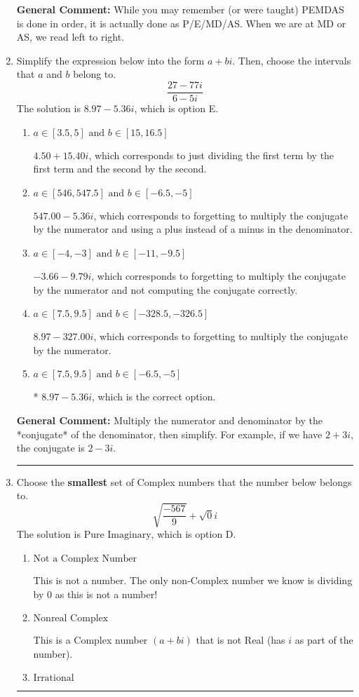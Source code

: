 \documentclass{extbook}[14pt]
\newcommand{\litem}[1]{\item #1

\rule{\textwidth}{0.4pt}}
\begin{document}
\begin{enumerate}
{\textbf{General Comment:} While you may remember (or were taught) PEMDAS is done in order, it is actually done as P/E/MD/AS. When we are at MD or AS, we read left to right.
}
\litem{
Simplify the expression below into the form $a+bi$. Then, choose the intervals that $a$ and $b$ belong to.
\[ \frac{27 - 77 i}{6 - 5 i} \]The solution is \( 8.97  - 5.36 i \), which is option E.\begin{enumerate}[label=\Alph*.]
\item \( a \in [3.5, 5] \text{ and } b \in [15, 16.5] \)

 $4.50  + 15.40 i$, which corresponds to just dividing the first term by the first term and the second by the second.
\item \( a \in [546, 547.5] \text{ and } b \in [-6.5, -5] \)

 $547.00  - 5.36 i$, which corresponds to forgetting to multiply the conjugate by the numerator and using a plus instead of a minus in the denominator.
\item \( a \in [-4, -3] \text{ and } b \in [-11, -9.5] \)

 $-3.66  - 9.79 i$, which corresponds to forgetting to multiply the conjugate by the numerator and not computing the conjugate correctly.
\item \( a \in [7.5, 9.5] \text{ and } b \in [-328.5, -326.5] \)

 $8.97  - 327.00 i$, which corresponds to forgetting to multiply the conjugate by the numerator.
\item \( a \in [7.5, 9.5] \text{ and } b \in [-6.5, -5] \)

* $8.97  - 5.36 i$, which is the correct option.
\end{enumerate}

\textbf{General Comment:} Multiply the numerator and denominator by the *conjugate* of the denominator, then simplify. For example, if we have $2+3i$, the conjugate is $2-3i$.
}
\litem{
Choose the \textbf{smallest} set of Complex numbers that the number below belongs to.
\[ \sqrt{\frac{-567}{9}}+\sqrt{0}i \]The solution is \( \text{Pure Imaginary} \), which is option D.\begin{enumerate}[label=\Alph*.]
\item \( \text{Not a Complex Number} \)

This is not a number. The only non-Complex number we know is dividing by 0 as this is not a number!
\item \( \text{Nonreal Complex} \)

This is a Complex number $(a+bi)$ that is not Real (has $i$ as part of the number).
\item \( \text{Irrational} \)


\end{enumerate}}
\end{enumerate}
\end{document}

